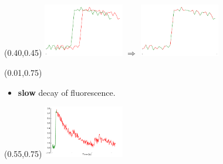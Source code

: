 \documentclass[final]{beamer}
\begin{document}
\begin{frame}
\begin{textblock}{1}(0.40,0.45)
\includegraphics[width=3.5cm]{images/original_curve_sampling.pdf} $\Rightarrow$
\includegraphics[width=3.5cm]{images/original_curve_sampling_2.pdf}
\end{textblock}


\begin{textblock}{1}(0.01,0.75)
\begin{itemize}
\item {\color{red} \textbf{slow} decay} of fluorescence.
\end{itemize}
\end{textblock}

\begin{textblock}{1}(0.55,0.75)
\includegraphics[width=3.5cm]{images/original_curve_gr_2.pdf}
\end{textblock}







\end{frame}
\end{document}
